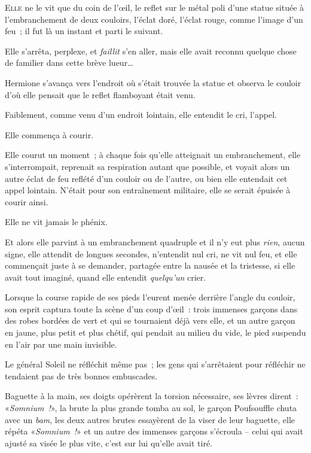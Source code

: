 
\lettrine{E}{lle} ne le vit que du coin de l'œil, le reflet sur le métal poli d'une statue située à l'embranchement de deux couloirs, l'éclat doré, l'éclat rouge, comme l'image d'un feu~; il fut là un instant et parti le suivant.

Elle s'arrêta, perplexe, et \emph{faillit} s'en aller, mais elle avait reconnu quelque chose de familier dans cette brève lueur…

Hermione s'avança vers l'endroit où s'était trouvée la statue et observa le couloir d'où elle pensait que le reflet flamboyant était venu.

Faiblement, comme venu d'un endroit lointain, elle entendit le cri, l'appel.

Elle commença à courir.

Elle courut un moment~; à chaque fois qu'elle atteignait un embranchement, elle s'interrompait, reprenait sa respiration autant que possible, et voyait alors un autre éclat de feu reflété d'un couloir ou de l'autre, ou bien elle entendait cet appel lointain. N'était pour son entraînement militaire, elle se serait épuisée à courir ainsi.

Elle ne vit jamais le phénix.

Et alors elle parvint à un embranchement quadruple et il n'y eut plus \emph{rien}, aucun signe, elle attendit de longues secondes, n'entendit nul cri, ne vit nul feu, et elle commençait juste à se demander, partagée entre la nausée et la tristesse, si elle avait tout imaginé, quand elle entendit \emph{quelqu'un} crier.

Lorsque la course rapide de ses pieds l'eurent menée derrière l'angle du couloir, son esprit captura toute la scène d'un coup d'œil~: trois immenses garçons dans des robes bordées de vert et qui se tournaient déjà vers elle, et un autre garçon en jaune, plus petit et plus chétif, qui pendait au milieu du vide, le pied suspendu en l'air par une main invisible.

Le général Soleil ne réfléchit même pas~; les gens qui s'arrêtaient pour réfléchir ne tendaient pas de très bonnes embuscades.

Baguette à la main, ses doigts opérèrent la torsion nécessaire, ses lèvres dirent~: «\emph{Somnium~!}», la brute la plus grande tomba au sol, le garçon Poufsouffle chuta avec un \emph{bam}, les deux autres brutes essayèrent de la viser de leur baguette, elle répéta «\emph{Somnium~!}» et un autre des immenses garçons s'écroula -- celui qui avait ajusté sa visée le plus vite, c'est sur lui qu'elle avait tiré.

